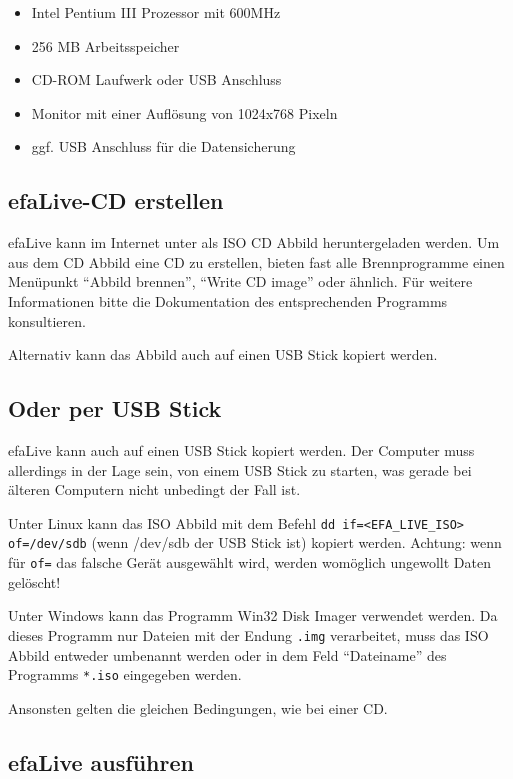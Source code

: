 \documentclass[a4paper,12pt,twoside]{article}
\begin{document}
\begin{itemize}
    \item Intel Pentium III Prozessor mit 600MHz
    \item 256 MB Arbeitsspeicher
    \item CD-ROM Laufwerk oder USB Anschluss
    \item Monitor mit einer Auflösung von 1024x768 Pixeln
    \item ggf. USB Anschluss für die Datensicherung
\end{itemize}

\subsection{efaLive-CD erstellen}
\label{sct:cd_erstellen}
efaLive kann im Internet unter \cite{EFA4} als ISO CD Abbild
heruntergeladen werden. Um aus dem CD Abbild eine CD zu erstellen,
bieten fast alle Brennprogramme einen Menüpunkt "`Abbild brennen"', 
"`Write CD image"' oder ähnlich. Für weitere Informationen bitte 
die Dokumentation des entsprechenden Programms konsultieren. 

Alternativ kann das Abbild auch auf einen USB Stick kopiert werden.

\subsection{Oder per USB Stick}
\label{sct:usb_stick}
efaLive kann auch auf einen USB Stick kopiert werden.
Der Computer muss allerdings in der Lage sein, von einem USB Stick zu
starten, was gerade bei älteren Computern nicht unbedingt der Fall ist.

Unter Linux kann das ISO Abbild mit dem Befehl \texttt{dd if={\textless}EFA\_LIVE\_ISO{\textgreater} 
of=/dev/sdb} (wenn /dev/sdb der USB Stick ist) kopiert werden. Achtung: 
wenn für \texttt{of=} das falsche Gerät ausgewählt wird, werden womöglich 
ungewollt Daten gelöscht!

Unter Windows kann das Programm Win32 Disk Imager \cite{IMG1} verwendet
werden. Da dieses Programm nur Dateien mit der Endung \texttt{.img} 
verarbeitet, muss das ISO Abbild entweder umbenannt werden oder in dem 
Feld "`Dateiname"' des Programms \texttt{*.iso} eingegeben werden.

Ansonsten gelten die gleichen Bedingungen, wie bei einer CD.


\subsection{efaLive ausführen}
\label{sct:live_ausfuehren}
\end{document}
